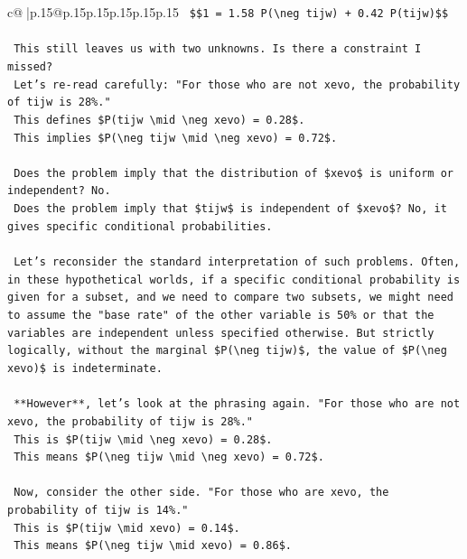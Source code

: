 \documentclass{article}
\begin{document}
{\begin{supertabular}{c@{$\;$}|p{.15\linewidth}@{}p{.15\linewidth}p{.15\linewidth}p{.15\linewidth}p{.15\linewidth}p{.15\linewidth}}
{{{\texttt{    \$\$1 = 1.58 P(\textbackslash{}neg tijw) + 0.42 P(tijw)\$\$} \\
\\ 
\texttt{    This still leaves us with two unknowns. Is there a constraint I missed?} \\
\texttt{    Let's re{-}read carefully: "For those who are not xevo, the probability of tijw is 28\%."} \\
\texttt{    This defines \$P(tijw \textbackslash{}mid \textbackslash{}neg xevo) = 0.28\$.} \\
\texttt{    This implies \$P(\textbackslash{}neg tijw \textbackslash{}mid \textbackslash{}neg xevo) = 0.72\$.} \\
\\ 
\texttt{    Does the problem imply that the distribution of \$xevo\$ is uniform or independent? No.} \\
\texttt{    Does the problem imply that \$tijw\$ is independent of \$xevo\$? No, it gives specific conditional probabilities.} \\
\\ 
\texttt{    Let's reconsider the standard interpretation of such problems. Often, in these hypothetical worlds, if a specific conditional probability is given for a subset, and we need to compare two subsets, we might need to assume the "base rate" of the other variable is 50\% or that the variables are independent unless specified otherwise. But strictly logically, without the marginal \$P(\textbackslash{}neg tijw)\$, the value of \$P(\textbackslash{}neg xevo)\$ is indeterminate.} \\
\\ 
\texttt{    **However**, let's look at the phrasing again. "For those who are not xevo, the probability of tijw is 28\%."} \\
\texttt{    This is \$P(tijw \textbackslash{}mid \textbackslash{}neg xevo) = 0.28\$.} \\
\texttt{    This means \$P(\textbackslash{}neg tijw \textbackslash{}mid \textbackslash{}neg xevo) = 0.72\$.} \\
\\ 
\texttt{    Now, consider the other side. "For those who are xevo, the probability of tijw is 14\%."} \\
\texttt{    This is \$P(tijw \textbackslash{}mid xevo) = 0.14\$.} \\
\texttt{    This means \$P(\textbackslash{}neg tijw \textbackslash{}mid xevo) = 0.86\$.} \\
\\ 
}}}
\end{supertabular}}
\end{document}
